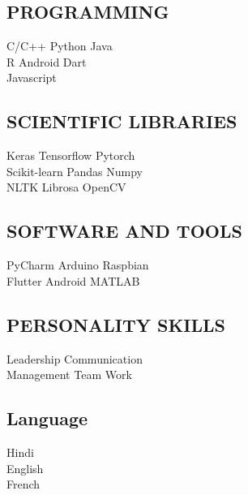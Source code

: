 \documentclass[]{deedy-resume-openfont}
\begin{document}
\begin{minipage}[t]{0.33\textwidth}
\subsection{PROGRAMMING}
\textbullet{}   C/C++ \textbullet{}   Python \textbullet{} Java \\
\textbullet{} R \textbullet{} Android \textbullet{} Dart \\ 
\textbullet{} Javascript 
\sectionsep
\subsection{SCIENTIFIC LIBRARIES}
\textbullet{} Keras \textbullet{} Tensorflow \textbullet{} Pytorch \\
\textbullet{} Scikit-learn \textbullet{} Pandas \textbullet{} Numpy \\
\textbullet{} NLTK \textbullet{} Librosa \textbullet{} OpenCV \\ 
\sectionsep
\subsection{SOFTWARE AND TOOLS}
\textbullet{} PyCharm \textbullet{} Arduino \textbullet{} Raspbian \\
\textbullet{} Flutter \textbullet{} Android \textbullet{} MATLAB \\
\sectionsep
\subsection{PERSONALITY SKILLS}
\textbullet{} Leadership \textbullet{} Communication \\
\textbullet{} Management \textbullet{} Team Work
\sectionsep
\subsection{Language}
 Hindi\\
 English\\
 French\\
%
%

\end{minipage} 
\hfill
\end{document}
